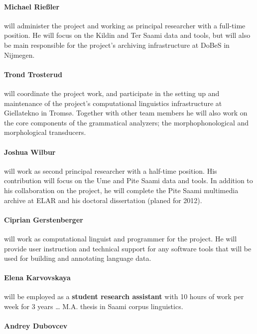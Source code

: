 \documentclass[a4paper,12pt]{article}
\begin{document}
{{{{\paragraph{Michael Rießler} will administer the project and working as principal researcher with a full-time position. He will focus on the Kildin and Ter Saami data and tools, but will also be main responsible for the project's archiving infrastructure at DoBeS in Nijmegen.

\paragraph{Trond Trosterud} will coordinate the project work, and participate in the setting up and maintenance of the project's computational linguistics infrastructure at Giellatekno in Tromsø. Together with other team members he will also work on the core components of the grammatical analyzers; the morphophonological and morphological transducers.

\paragraph{Joshua Wilbur} will work as second principal researcher with a half-time position. His contribution will focus on the Ume and Pite Saami data and tools. In addition to his collaboration on the project, he will complete the Pite Saami multimedia archive at ELAR and his doctoral dissertation (planed for 2012).

\paragraph{Ciprian Gerstenberger} will work as computational linguist and programmer for the project. He will provide user instruction and technical support for any software tools that will be used for building and annotating language data. 

\paragraph{Elena Karvovskaya} will be employed as a \textbf{student research assistant} with 10 hours of work per week for 3 years … M.A. thesis in Saami corpus linguistics.

\paragraph{Andrey Dubovcev}

}}}}
\end{document}
